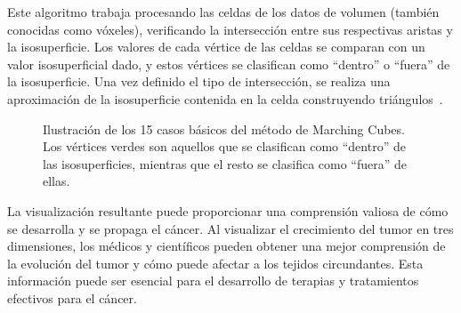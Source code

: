 Este algoritmo trabaja procesando las celdas de los datos de volumen (también conocidas como vóxeles), verificando la intersección entre sus respectivas aristas y la isosuperficie. Los valores de cada vértice de las celdas se comparan con un valor isosuperficial dado, y estos vértices se clasifican como ``dentro''  o ``fuera'' de la isosuperficie. Una vez definido el tipo de intersección, se realiza una aproximación de la isosuperficie contenida en la celda construyendo triángulos~\cite{cirne2013}.

\begin{figure}[!ht]
	\begin{center}
	\end{center}\vspace*{-0.6cm}
	\caption[Ilustración de Marching Cubes]{Ilustración de los 15 casos básicos del método de Marching Cubes. Los vértices verdes son aquellos que se clasifican como ``dentro'' de las isosuperficies, mientras que el resto se clasifica como ``fuera'' de ellas.}
	\label{fig-marching-cubes1}
	\end{figure}

La visualización resultante puede proporcionar una comprensión valiosa de cómo se desarrolla y se propaga el cáncer. Al visualizar el crecimiento del tumor en tres dimensiones, los médicos y científicos pueden obtener una mejor comprensión de la evolución del tumor y cómo puede afectar a los tejidos circundantes. Esta información puede ser esencial para el desarrollo de terapias y tratamientos efectivos para el cáncer.

